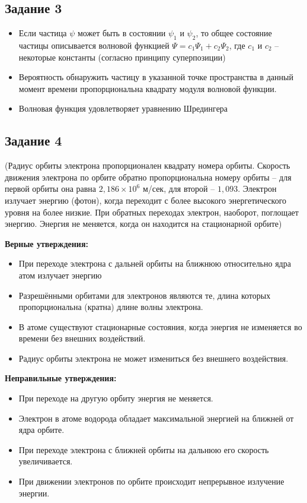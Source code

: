 \documentclass[../main.tex]{subfiles}
\begin{document}
\subsection{Задание 3}
\begin{itemize}
    \item Если частица $\psi$ может быть в состоянии $\psi_1$ и $\psi_2$, то общее состояние частицы описывается волновой функцией $\Psi = c_1 \Psi_1 + c_2 \Psi_2$, где $c_1$ и $c_2$ -- некоторые константы (согласно принципу суперпозиции)
    \item Вероятность обнаружить частицу в указанной точке пространства в данный момент времени пропорциональна квадрату модуля волновой функции.
    \item Волновая функция удовлетворяет уравнению Шредингера
\end{itemize}

\subsection{Задание 4}
(Радиус орбиты электрона пропорционален квадрату номера орбиты. Скорость движения электрона по орбите обратно пропорциональна номеру орбиты -- для первой орбиты она равна $2,186 \times 10^6$ м/сек, для второй -- $1,093$.
Электрон излучает энергию (фотон), когда переходит с более высокого энергетического уровня на более низкие. При обратных переходах электрон, наоборот, поглощает энергию. Энергия не меняется, когда он находится на стационарной орбите)

\textbf{Верные утверждения:}
\begin{itemize}
    \item При переходе электрона с дальней орбиты на ближнюю относительно ядра атом излучает энергию
    \item Разрешёнными орбитами для электронов являются те, длина которых пропорциональна (кратна) длине волны электрона.
    \item В атоме существуют стационарные состояния, когда энергия не изменяется во времени без внешних воздействий.
    \item Радиус орбиты электрона не может измениться без внешнего воздействия.
\end{itemize}

\textbf{Неправильные утверждения:}
\begin{itemize}
    \item При переходе на другую орбиту энергия не меняется.
    \item Электрон в атоме водорода обладает максимальной энергией на ближней от ядра орбите.
    \item При переходе электрона с ближней орбиты на дальнюю его скорость увеличивается.
    \item При движении электронов по орбите происходит непрерывное излучение энергии.
\end{itemize}
\end{document}

